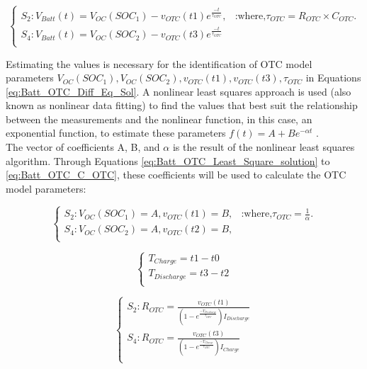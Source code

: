 \begin{equation}\label{eq:Batt_OTC_Diff_Eq_Sol}
	\begin{cases}
	  S_2 : V_{Batt}(t) = V_{OC}(SOC_1) - v_{OTC}(t1) e^{\frac{-t}{\tau_{OTC}}} , & \text{:where,} \tau_{OTC} = R_{OTC}\times C_{OTC}.\\
	  S_4 : V_{Batt}(t) = V_{OC}(SOC_2) - v_{OTC}(t3) e^{\frac{-t}{\tau_{OTC}}}\\
	\end{cases}
\end{equation}

Estimating the values is necessary for the identification of OTC model parameters $V_{OC}(SOC_1),V_{OC}(SOC_2),v_{OTC}(t1),v_{OTC}(t3), \tau_{OTC}$  
in Equations \ref{eq:Batt_OTC_Diff_Eq_Sol}. A nonlinear least squares approach is used (also known as nonlinear data fitting) to find the values that best suit the relationship between the measurements and the nonlinear function, in this case, an exponential function, to estimate these parameters
$f(t) = A + Be^{-\alpha t}$ . \\

The vector of coefficients A, B, and $\alpha$ is the result of the nonlinear least squares algorithm. Through Equations \ref{eq:Batt_OTC_Least_Square_solution} to \ref{eq:Batt_OTC_C_OTC}, these coefficients will be used to calculate the OTC model parameters:

\begin{equation}\label{eq:Batt_OTC_Least_Square_solution}
	\begin{cases}
	  S_2 : V_{OC}(SOC_1) = A, v_{OTC}(t1) = B, & \text{:where,} \tau_{OTC} = \frac{1}{\alpha}.\\
	  S_4 : V_{OC}(SOC_2) = A, v_{OTC}(t2) = B,\\
	\end{cases}
\end{equation}

\begin{equation}\label{eq:Batt_OTC_T_charge_discharge}
	\begin{cases}
		T_{Charge} = t1 - t0\\
		T_{Discharge} = t3 - t2 \\
	\end{cases}
\end{equation}

\begin{equation}\label{eq:Batt_OTC_R_OTC}
	\begin{cases}
	  S_2 : R_{OTC} = \frac{v_{OTC}(t1)}{ \left( 1 - e^{\frac{- T_{Discharge} }{\tau_{OTC} }}\right) I_{Discharge}} \\
	  S_4 : R_{OTC} = \frac{v_{OTC}(t3)}{ \left( 1 - e^{\frac{- T_{Charge} }{\tau_{OTC} }}\right) I_{Charge}} \\
	\end{cases}
\end{equation}

